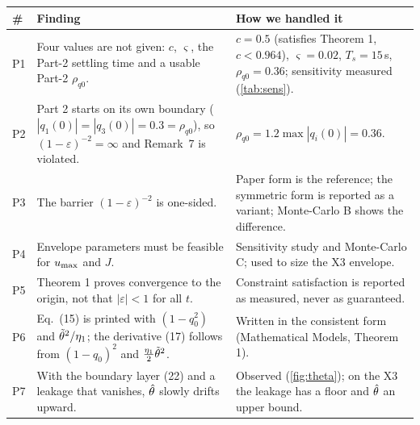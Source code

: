 \begin{center}\small
\begin{longtable}{@{}l p{6.4cm} p{6.6cm}@{}}
\toprule
\textbf{\#} & \textbf{Finding} & \textbf{How we handled it}\\
\midrule\endhead
P1 & Four values are not given: $c$, $\varsigma$, the Part-2 settling time and a usable Part-2 $\rho_{q0}$. & $c=0.5$ (satisfies Theorem 1, $c<0.964$), $\varsigma=0.02$, $T_s=15$\,s, $\rho_{q0}=0.36$; sensitivity measured (\cref{tab:sens}).\\
P2 & Part 2 starts on its own boundary ($|q_1(0)|=|q_3(0)|=0.3=\rho_{q0}$), so $(1-\varepsilon)^{-2}=\infty$ and Remark~7 is violated. & $\rho_{q0}=1.2\max|q_i(0)|=0.36$.\\
P3 & The barrier $(1-\varepsilon)^{-2}$ is one-sided. & Paper form is the reference; the symmetric form is reported as a variant; Monte-Carlo B shows the difference.\\
P4 & Envelope parameters must be feasible for $u_{\max}$ and $J$. & Sensitivity study and Monte-Carlo C; used to size the X3 envelope.\\
P5 & Theorem 1 proves convergence to the origin, not that $|\varepsilon|<1$ for all $t$. & Constraint satisfaction is reported as measured, never as guaranteed.\\
P6 & Eq.~(15) is printed with $(1-q_0^2)$ and $\tilde{\theta}^2/\eta_1$; the derivative (17) follows from $(1-q_0)^2$ and $\tfrac{\eta_1}{2}\tilde{\theta}^2$. & Written in the consistent form (Mathematical Models, Theorem 1).\\
P7 & With the boundary layer (22) and a leakage that vanishes, $\hat{\theta}$ slowly drifts upward. & Observed (\cref{fig:theta}); on the X3 the leakage has a floor and $\hat{\theta}$ an upper bound.\\
\bottomrule
\end{longtable}
\end{center}
